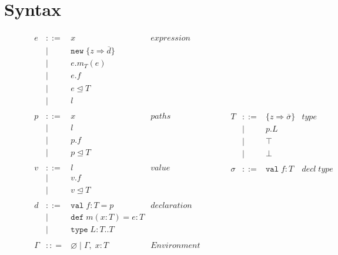 \documentclass{llncs}
\numberwithin{subcase}{case}
\numberwithin{case}{theorem}
\numberwithin{case}{lemma}
\begin{document}
\section{Syntax}

\begin{figure}[h]
\[
\begin{array}{lll}
\begin{array}{lllr}
e & ::= & x & expression \\
& | & \texttt{new} \; \{z \Rightarrow \overline{d}\}&\\
& | & e.m_T(e) &\\
& | & e.f &\\
& | & e \unlhd T&\\
& | & l &\\
&&\\
p & ::= & x & paths \\
& | & l &\\
& | & p.f &\\
& | & p \unlhd T &\\
&&\\
v & ::= & l & value \\
& | & v.f &\\
& | & v \unlhd T &\\
&&\\
d & ::= & \texttt{val} \; f : T = p & declaration \\
  & |   & \texttt{def} \; m(x:T) = e : T &\\
  & |   & \texttt{type} \; L : T .. T&\\
&&\\
\Gamma & :: = & \varnothing \; | \; \Gamma,\; x : T & Environment \\
 \end{array}
& ~~~~~~
&
\begin{array}{lllr}
T & ::= & \{z \Rightarrow \overline{\sigma}\} & type \\
& | & p.L &\\
& | & \top & \\
& | & \bot & \\
&&\\
\sigma & ::= & \texttt{val} \; f:T & decl \; type\\

\end{array}
\end{array}\]
\end{figure}
\end{document}
